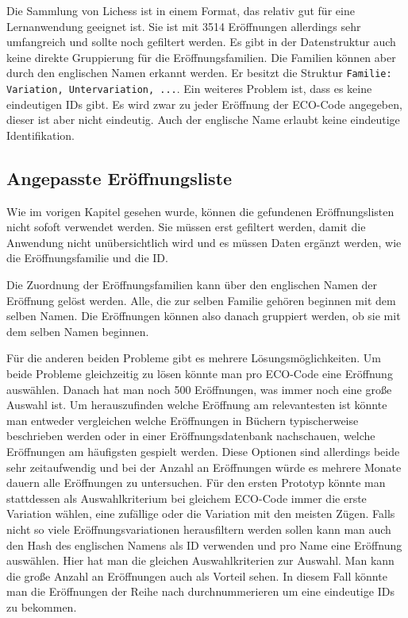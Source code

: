 Die Sammlung von Lichess ist in einem Format, das relativ gut für eine Lernanwendung geeignet ist. Sie ist mit 3514 Eröffnungen allerdings sehr umfangreich und sollte noch gefiltert werden. Es gibt in der Datenstruktur auch keine direkte Gruppierung für die Eröffnungsfamilien. Die Familien können aber durch den englischen Namen erkannt werden. Er besitzt die Struktur \lstinline{Familie: Variation, Untervariation, ...}. Ein weiteres Problem ist, dass es keine eindeutigen IDs gibt. Es wird zwar zu jeder Eröffnung der ECO-Code angegeben, dieser ist aber nicht eindeutig. Auch der englische Name erlaubt keine eindeutige Identifikation. 

\subsection{Angepasste Eröffnungsliste}
\label{cp:opening list}
Wie im vorigen Kapitel gesehen wurde, können die gefundenen Eröffnungslisten nicht sofoft verwendet werden. Sie müssen erst gefiltert werden, damit die Anwendung nicht unübersichtlich wird und es müssen Daten ergänzt werden, wie die Eröffnungsfamilie und die ID.

Die Zuordnung der Eröffnungsfamilien kann über den englischen Namen der Eröffnung gelöst werden. Alle, die zur selben Familie gehören beginnen mit dem selben Namen. Die Eröffnungen können also danach gruppiert werden, ob sie mit dem selben Namen beginnen.

Für die anderen beiden Probleme gibt es mehrere Lösungsmöglichkeiten. Um beide Probleme gleichzeitig zu lösen könnte man pro ECO-Code eine Eröffnung auswählen. Danach hat man noch 500 Eröffnungen, was immer noch eine große Auswahl ist. Um herauszufinden welche Eröffnung am relevantesten ist könnte man entweder vergleichen welche Eröffnungen in Büchern typischerweise beschrieben werden oder in einer Eröffnungsdatenbank nachschauen, welche Eröffnungen am häufigsten gespielt werden. Diese Optionen sind allerdings beide sehr zeitaufwendig und bei der Anzahl an Eröffnungen würde es mehrere Monate dauern alle Eröffnungen zu untersuchen. Für den ersten Prototyp könnte man stattdessen als Auswahlkriterium bei gleichem ECO-Code immer die erste Variation wählen, eine zufällige oder die Variation mit den meisten Zügen. Falls nicht so viele Eröffnungsvariationen herausfiltern werden sollen kann man auch den Hash des englischen Namens als ID verwenden und pro Name eine Eröffnung auswählen. Hier hat man die gleichen Auswahlkriterien zur Auswahl. Man kann die große Anzahl an Eröffnungen auch als Vorteil sehen. In diesem Fall könnte man die Eröffnungen der Reihe nach durchnummerieren um eine eindeutige IDs zu bekommen.
